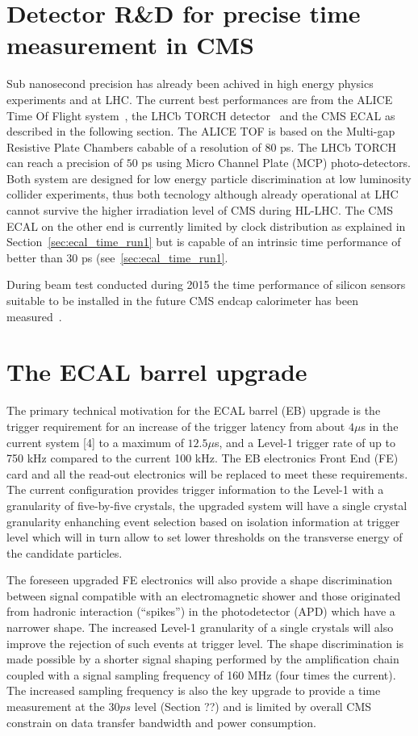 \section{Detector R\&D for precise time measurement in CMS}
Sub nanosecond precision has already been achived in high energy physics experiments and at LHC.
The current best performances are from the ALICE Time Of Flight system~\cite{alice_tof}, the LHCb TORCH
detector~\cite{lhcb_torch} and the CMS ECAL as described in the following section. The ALICE TOF is
based on the Multi-gap Resistive Plate Chambers cabable of a resolution of $80$ ps. The LHCb TORCH
can reach a precision of $50$ ps using Micro Channel Plate (MCP) photo-detectors. Both system are
designed for low energy particle discrimination at low luminosity collider experiments, thus both tecnology
although already operational at LHC cannot survive the higher irradiation level of CMS during HL-LHC.
The CMS ECAL on the other end is currently limited by clock distribution as explained in Section~\ref{sec:ecal_time_run1}
but is capable of an intrinsic time performance of better than $30$ ps (see~\ref{sec:ecal_time_run1}.

During beam test conducted during 2015 the time performance of silicon sensors suitable to be installed
in the future CMS endcap calorimeter has been measured~\cite{hgcal_tb_time}.

\section{The ECAL barrel upgrade}
The primary technical motivation for the ECAL barrel (EB) upgrade is the trigger requirement for
an increase of the trigger latency from about $4\mu$s in the current system [4] to a maximum of $12.5\mu$s,
and a Level-1 trigger rate of up to 750 kHz compared to the current 100 kHz.
The EB electronics Front End (FE) card and all the read-out electronics will be replaced to
meet these requirements. The current configuration provides trigger information to the Level-1
with a granularity of five-by-five crystals, the upgraded system will have a single crystal granularity
enhanching event selection based on isolation information at trigger level which will in turn allow
to set lower thresholds on the transverse energy of the candidate particles.

The foreseen upgraded FE electronics will also provide a shape discrimination between
signal compatible with an electromagnetic shower and those originated from hadronic interaction (``spikes'') in
the photodetector (APD) which have a narrower shape. The increased Level-1 granularity of a single crystals
will also improve the rejection of such events at trigger level.
The shape discrimination is made possible by a shorter signal shaping performed by the amplification chain
coupled with a signal sampling frequency of 160 MHz (four times the current). The increased sampling
frequency is also the key upgrade to provide a time measurement at the $30 ps$ level (Section ??) and
is limited by overall CMS constrain on data transfer bandwidth and power consumption.

